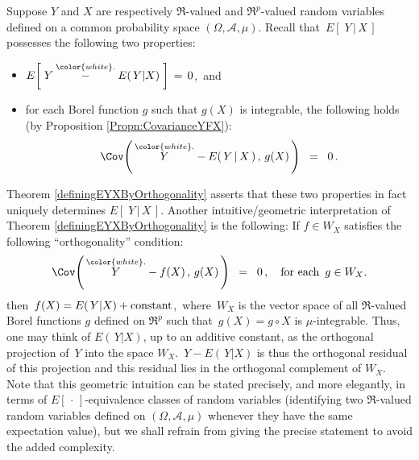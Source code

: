 \begin{remark}\mbox{}
\vskip 0.1cm
\noindent
Suppose $Y$ and $X$ are respectively $\Re$-valued and $\Re^{p}$-valued random variables
defined on a common probability space $(\Omega,\mathcal{A},\mu)$.
Recall that \,$E\!\left[\;Y\,\vert\,X\,\right]$\, possesses the following two properties:
\begin{itemize}
\item
	$E\!\left[\;Y \overset{{\color{white}.}}{-} E\!\left(\,Y\vert X\right)\;\right] \,=\, 0$,\, and
\item
	for each Borel function $g$ such that $g(X)$ is integrable,
	the following holds (by Proposition \ref{Propn:CovarianceYFX}):
	\begin{equation*}
	\Cov\!\left(\,\overset{{\color{white}.}}{Y} - E(\,Y\,\vert\,X\,)\,,\,g(X)\,\right)
	\;\; = \;\; 0 \,.
	\end{equation*}
\end{itemize}
Theorem \ref{definingEYXByOrthogonality} asserts that these two properties
in fact uniquely determines $E\!\left[\;Y\,\vert\,X\,\right]$.
Another intuitive/geometric interpretation of Theorem \ref{definingEYXByOrthogonality}
is the following:
\vskip 0.3cm
\noindent
If $f \in W_{X}$ satisfies the following ``orthogonality'' condition:
\begin{equation*}
\Cov\!\left(\,\overset{{\color{white}.}}{Y} - f(X)\,,\,g(X)\,\right)
\;\; = \;\; 0 \,,
\quad
\textnormal{for each \,$g \in W_{X}$.}
\end{equation*}
then \,$f(X) = E\!\left(\,Y\vert X\right) + \textnormal{constant}$,\,
where \,$W_{X}$ is the vector space of all $\Re$-valued Borel functions $g$ defined on
$\Re^{p}$ such that \,$g(X) = g \circ X$ is $\mu$-integrable.
Thus, one may think of $E\!\left(\,Y\vert X\right)$, up to an additive constant, as the
{\color{red}orthogonal projection} of \,$Y$ into the space $W_{X}$.
\,$Y - E\!\left(\,Y\vert X\right)$ is thus the orthogonal residual of this projection and
this residual lies in the orthogonal complement of $W_{X}$.
\vskip 0.3cm
\noindent
Note that this geometric intuition can be stated precisely, and more elegantly, in
terms of $E\!\left[\,\cdot\,\right]$-equivalence classes of random variables
(identifying two $\Re$-valued random variables defined on $(\Omega,\mathcal{A},\mu)$
whenever they have the same expectation value), but we shall
refrain from giving the precise statement to avoid the added complexity.
\end{remark}


\renewcommand{\theenumi}{\roman{enumi}}
\renewcommand{\labelenumi}{\textnormal{(\theenumi)}$\;\;$}

